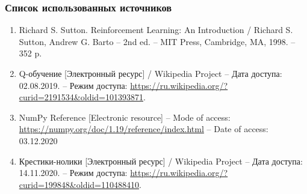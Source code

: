 \documentclass{beamer}
\begin{document}
\begin{frame}
    \frametitle{Список использованных источников}

    \begin{enumerate}
        \item \label{itm:sutton} Richard S. Sutton. Reinforcement Learning: An Introduction / Richard S. Sutton, Andrew G. Barto – 2nd ed. – MIT Press, Cambridge, MA, 1998. – 352 p.

    
        \item \label{itm:q-learning} Q-обучение [Электронный ресурс] / Wikipedia Project – Дата доступа: 02.08.2019. – Режим доступа: \url{https://ru.wikipedia.org/?curid=2191534&oldid=101393871}.
        
        \item \label{itm:numpy} NumPy Reference [Electronic resource] -- Mode of access: \url{https://numpy.org/doc/1.19/reference/index.html} -- Date of access: 03.12.2020 
        
        \item \label{itm:last} Крестики-нолики [Электронный ресурс] / Wikipedia Project – Дата доступа: 14.11.2020. – Режим доступа: \url{https://ru.wikipedia.org/?curid=199848&oldid=110488410}.
        
        
    \end{enumerate}
    
\end{frame}
\end{document}
